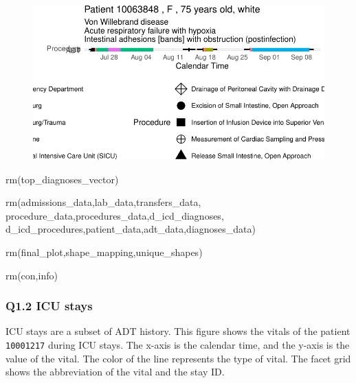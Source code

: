 \documentclass[
]{article}
\newenvironment{Shaded}{\begin{snugshade}}{\end{snugshade}}
\newcommand{\FunctionTok}[1]{\textcolor[rgb]{0.00,0.00,0.00}{#1}}
\newcommand{\NormalTok}[1]{\textcolor[rgb]{0.00,0.00,0.00}{#1}}
\begin{document}
\begin{figure}[H]

{\centering \includegraphics{hw3_files/figure-pdf/unnamed-chunk-6-1.pdf}

}

\end{figure}

\begin{Shaded}
\begin{Highlighting}[]
\FunctionTok{rm}\NormalTok{(top\_diagnoses\_vector)}
\end{Highlighting}
\end{Shaded}

\begin{Shaded}
\begin{Highlighting}[]
\FunctionTok{rm}\NormalTok{(admissions\_data,lab\_data,transfers\_data,}
\NormalTok{   procedure\_data,procedures\_data,d\_icd\_diagnoses,}
\NormalTok{   d\_icd\_procedures,patient\_data,adt\_data,diagnoses\_data)}

\FunctionTok{rm}\NormalTok{(final\_plot,shape\_mapping,unique\_shapes)}

\FunctionTok{rm}\NormalTok{(con,info)}
\end{Highlighting}
\end{Shaded}

\hypertarget{q1.2-icu-stays}{%
\subsubsection{Q1.2 ICU stays}\label{q1.2-icu-stays}}

ICU stays are a subset of ADT history. This figure shows the vitals of
the patient \texttt{10001217} during ICU stays. The x-axis is the
calendar time, and the y-axis is the value of the vital. The color of
the line represents the type of vital. The facet grid shows the
abbreviation of the vital and the stay ID.
\end{document}
